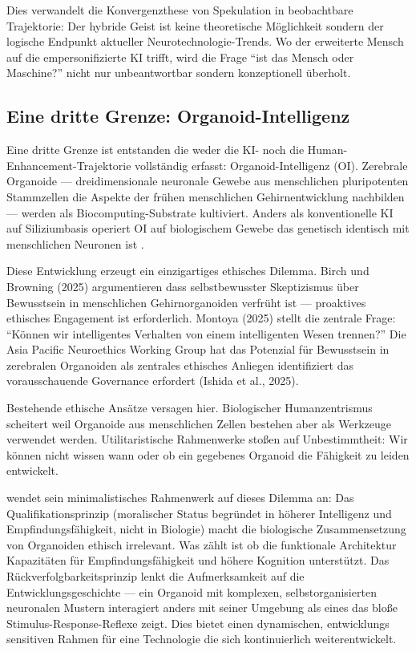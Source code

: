 \documentclass[acmcp, noacm]{acmart}
\begin{document}
Dies verwandelt die Konvergenzthese von Spekulation in beobachtbare Trajektorie: Der hybride Geist ist keine theoretische Möglichkeit sondern der logische Endpunkt aktueller Neurotechnologie-Trends. Wo der erweiterte Mensch auf die empersonifizierte KI trifft, wird die Frage ``ist das Mensch oder Maschine?'' nicht nur unbeantwortbar sondern konzeptionell überholt.

\subsection{Eine dritte Grenze: Organoid-Intelligenz}

Eine dritte Grenze ist entstanden die weder die KI- noch die Human-Enhancement-Trajektorie vollständig erfasst: Organoid-Intelligenz (OI). Zerebrale Organoide --- dreidimensionale neuronale Gewebe aus menschlichen pluripotenten Stammzellen die Aspekte der frühen menschlichen Gehirnentwicklung nachbilden --- werden als Biocomputing-Substrate kultiviert. Anders als konventionelle KI auf Siliziumbasis operiert OI auf biologischem Gewebe das genetisch identisch mit menschlichen Neuronen ist \cite{wang2026,luo_xie2025,montoya2025}.

Diese Entwicklung erzeugt ein einzigartiges ethisches Dilemma. Birch und Browning (2025) argumentieren dass selbstbewusster Skeptizismus über Bewusstsein in menschlichen Gehirnorganoiden verfrüht ist --- proaktives ethisches Engagement ist erforderlich. Montoya (2025) stellt die zentrale Frage: ``Können wir intelligentes Verhalten von einem intelligenten Wesen trennen?'' Die Asia Pacific Neuroethics Working Group hat das Potenzial für Bewusstsein in zerebralen Organoiden als zentrales ethisches Anliegen identifiziert das vorausschauende Governance erfordert (Ishida et al., 2025).

Bestehende ethische Ansätze versagen hier. Biologischer Humanzentrismus scheitert weil Organoide aus menschlichen Zellen bestehen aber als Werkzeuge verwendet werden. Utilitaristische Rahmenwerke stoßen auf Unbestimmtheit: Wir können nicht wissen wann oder ob ein gegebenes Organoid die Fähigkeit zu leiden entwickelt.

\cite{wang2026} wendet sein minimalistisches Rahmenwerk auf dieses Dilemma an: Das Qualifikationsprinzip (moralischer Status begründet in höherer Intelligenz und Empfindungsfähigkeit, nicht in Biologie) macht die biologische Zusammensetzung von Organoiden ethisch irrelevant. Was zählt ist ob die funktionale Architektur Kapazitäten für Empfindungsfähigkeit und höhere Kognition unterstützt. Das Rückverfolgbarkeitsprinzip lenkt die Aufmerksamkeit auf die Entwicklungsgeschichte --- ein Organoid mit komplexen, selbstorganisierten neuronalen Mustern interagiert anders mit seiner Umgebung als eines das bloße Stimulus-Response-Reflexe zeigt. Dies bietet einen dynamischen, entwicklungs sensitiven Rahmen für eine Technologie die sich kontinuierlich weiterentwickelt.
\end{document}
